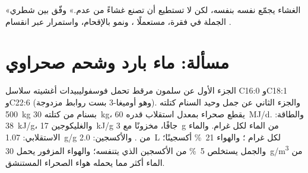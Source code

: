 \begin{exercise}[$\star\star\star$]\label{exo:b1:lipids:12}
«الغشاء يجمّع نفسه بنفسه، لكن  لا تستطيع أن تصنع غشاءً من
عدم.» وفّق بين شطري الجملة في فقرة، مستعملًا ،
ونمو  بالإقحام، واستمرار  عبر انقسام .
\end{exercise}

\section{مسألة: ماء بارد وشحم صحراوي}

\begin{problem}
\label{pb:b1:lipids:1}
الجزء الأول عن سلمون مرقط تحمل فوسفوليبيدات أغشيته سلاسل C16:0
وC18:1 وC22:6 (وهو  أوميغا-3 بست روابط مزدوجة). والجزء الثاني عن
جمل وحيد السنام كتلته \qty{500}{kg} بسنام من  كتلته
\qty{30}{kg}، يقطع صحراء بمعدل استقلاب قدره \qty{60}{MJ/d}. والطاقة:
 \qty{38}{kJ/g}، والغليكوجين \qty{17}{kJ/g} جافًا، مخزونًا مع
\qty{3}{g} من الماء لكل غرام. والماء الاستقلابي: \qty{1.07}{g/g} من
. والأكسجين: \qty{2.0}{L} لكل غرام ؛ والهواء \qty{21}{\%}
أكسجينًا؛ والجمل يستخلص \qty{5}{\%} من الأكسجين الذي يتنفسه؛ والهواء
المزفور يحمل \qty{30}{g/m^3} من الماء أكثر مما يحمله هواء الصحراء
المستنشق.


\end{problem}
